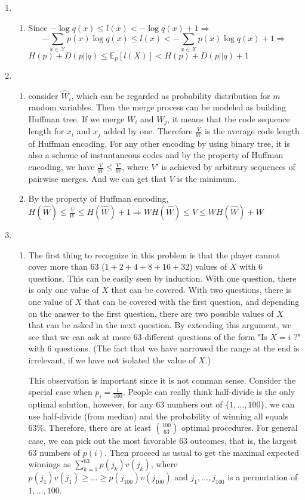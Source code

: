 \documentclass{article}
\def\E{\mathbb{E}}
\begin{document}
\begin{enumerate}
\begin{enumerate}[label=(\alph*)]
\end{enumerate}
\item
\begin{enumerate}[label=(\alph*)] 
\item 
Since $-\log q(x)\leq l(x)< -\log q(x)+1 \Rightarrow$
$$
-\sum_{x\in\mathcal{X}}p(x)\log q(x) \leq l(x) < -\sum_{x\in\mathcal{X}}p(x)\log q(x)+1  \Rightarrow
$$
$
H(p)+D(p||q) \leq \E_p [l(X)] < H(p)+D(p||q)+1
$
\end{enumerate}
\item
\begin{enumerate}[label=(\alph*)] 
\item consider $\hat{W}_i$, which can be regarded as probability distribution for $m$ random variables. Then the merge process can be modeled as building Huffman
tree. If we merge $W_i$ and $W_j$, it means that the code sequence length for $x_i$ and $x_j$ added by one. Therefore $\frac{V}{W}$ is the average code length of Huffman encoding. For any other encoding by using binary tree, it is also a scheme of instantaneous codes and by the property of Huffman encoding, we have
$\frac{V}{W}\leq \frac{V'}{W}$, where $V'$ is achieved by arbitrary sequences of pairwise merges. And we can get that $V$ is the minimum.
\item By the property of Huffman encoding, $H(\hat{W}) \leq \frac{V}{W} \leq H(\hat{W})+1 \Rightarrow WH(\hat{W})\leq V \leq WH(\hat{W})+W$
\end{enumerate}
\item
\begin{enumerate}[label=(\alph*)] 
\item
The first thing to recognize in this problem is that the player cannot cover more
than 63 ($1+2+4+8+16+32$) values of $X$ with 6 questions. This can be easily seen by induction.
With one question, there is only one value of $X$ that can be covered. With two
questions, there is one value of $X$ that can be covered with the first question,
and depending on the answer to the first question, there are two possible values
of $X$ that can be asked in the next question. By extending this argument, we see
that we can ask at more 63 different questions of the form "Is $X = i$ ?" with 6
questions. (The fact that we have narrowed the range at the end is irrelevant, if
we have not isolated the value of $X$.)

This observation is important since it is not comman sense. Consider the special case when $p_i=\frac{1}{100}$.
People can really think half-divide is the only optimal solution, however, for any 63 numbers out of $\{1,\dots,100\}$,
we can use half-divide (from median) and the probability of winning all equals $63\%$. Therefore, there are 
at least $\binom{100}{63}$ optimal procedures. For general case, we can pick out the most favorable $63$ outcomes, that is, the largest 63 numbers of $p(i)$. Then proceed as usual to get the maximal expected winnings as 
$\sum_{k=1}^{63}p(j_k)v(j_k)$, where $p(j_1)v(j_1)\geq \dots \geq p(j_{100})v(j_{100})$ and $j_1,\dots,j_{100}$ is a permutation of $1,\dots,100$.


\end{enumerate}
\end{enumerate}
\end{document}
